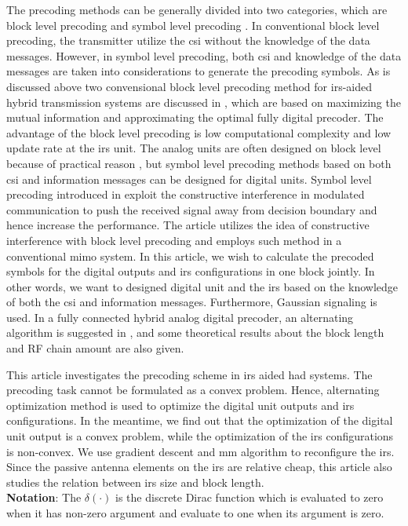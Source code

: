 \documentclass[12pt,draftclsnofoot,onecolumn,journal]{IEEEtran}
\begin{document}
The precoding methods can be generally divided into two categories, which are block level precoding and symbol level precoding \cite{domouchtsidis2020constant}. In conventional block level precoding, the transmitter utilize the \ac{csi} without the knowledge of the data messages. However, in symbol level precoding, both \ac{csi} and knowledge of the data messages are taken into considerations to generate the precoding symbols. As is discussed above two convensional block level precoding method for \ac{irs}-aided hybrid transmission systems are discussed in \cite{jamali2020intelligent}, which are based on maximizing the mutual information and approximating the optimal fully digital precoder. The advantage of the block level precoding is low computational complexity and low update rate at the \ac{irs} unit. The analog units are often designed on block level because of practical reason \cite{li2018hybrid}, but symbol level precoding methods based on both \ac{csi} and information messages can be designed for digital units. Symbol level precoding introduced in \cite{liu2019symbol} exploit the constructive interference in modulated communication to push the received signal away from decision boundary and hence increase the performance. The article \cite{li2022practical} utilizes the idea of constructive interference with block level precoding and employs such method in a conventional \ac{mimo} system. In this article, we wish to calculate the precoded symbols for the digital outputs and \ac{irs} configurations in one block jointly. In other words, we want to designed digital unit and the \ac{irs} based on the knowledge of both the \ac{csi} and information messages. Furthermore, Gaussian signaling is used. In a fully connected hybrid analog digital precoder, an alternating algorithm is suggested in \cite{sedaghat2017novel}, and some theoretical results about the block length and RF chain amount are also given.

This article investigates the precoding scheme in \ac{irs} aided \ac{had} systems. The precoding task cannot be formulated as a convex problem. Hence, alternating optimization method is used to optimize the digital unit outputs and \ac{irs} configurations. In the meantime, we find out that the optimization of the digital unit output is a convex problem, while the optimization of the \ac{irs} configurations is non-convex. We use gradient descent and \ac{mm} algorithm to reconfigure the \ac{irs}. Since the passive antenna elements on the \ac{irs} are relative cheap, this article also studies the relation between \ac{irs} size and block length. \\
\textbf{Notation}:
The $\delta(\cdot)$ is the discrete Dirac function which is evaluated to zero when it has non-zero argument and evaluate to one when its argument is zero.
\end{document}
